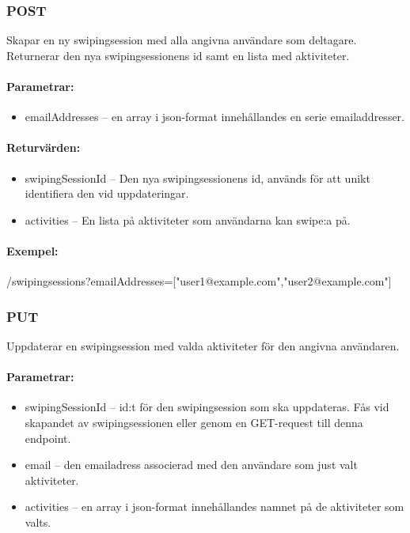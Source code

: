 \documentclass{article}
\begin{document}
\subsubsection*{POST}

Skapar en ny swipingsession med alla angivna användare som deltagare. Returnerar den nya swipingsessionens id samt en lista med aktiviteter.

\paragraph{Parametrar:}

\begin{itemize}		
	\item emailAddresses -- en array i json-format innehållandes en serie emailaddresser.			
\end{itemize}		

\paragraph{Returvärden:}
\label{par:swipingsessions_returv_rden_}

\begin{itemize}
    \item swipingSessionId --  Den nya swipingsessionens id, används för att unikt identifiera den vid uppdateringar.
    \item activities -- En lista på aktiviteter som användarna kan swipe:a på.
\end{itemize}

\paragraph{Exempel:} /swipingsessions?emailAddresses=["user1@example.com","user2@example.com"] 

\subsubsection*{PUT}

Uppdaterar en swipingsession med valda aktiviteter för den angivna användaren.

\paragraph{Parametrar:}

\begin{itemize}

	\item swipingSessionId -- id:t för den swipingsession som ska uppdateras. Fås vid skapandet av swipingsessionen eller genom en
		GET-request till denna endpoint.
	\item email -- den emailadress associerad med den användare som just valt aktiviteter.
	\item activities -- en array i json-format innehållandes namnet på de aktiviteter som valts.

\end{itemize}
\end{document}
